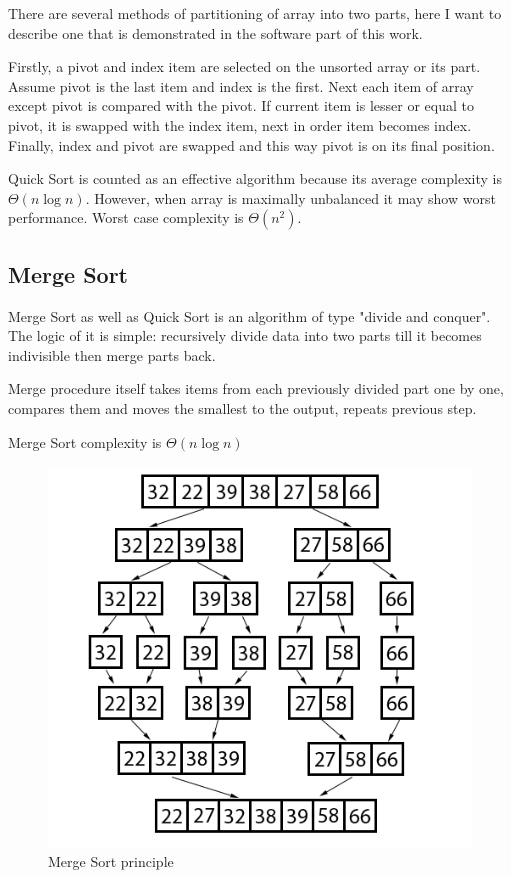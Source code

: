 \documentclass[
  field=inf,
  biblatex,
  language=english,
  glossaries,
  index
]{kidiplom}
\begin{document}
There are several methods of partitioning of array into two parts, here I want to describe one that is demonstrated in the software part of this work.

Firstly, a pivot and index item are selected on the unsorted array or its part. Assume pivot is the last item and index is the first. Next each item of array except pivot is compared with the pivot. If current item is lesser or equal to pivot, it is swapped with the index item, next in order item becomes index. Finally, index and pivot are swapped and this way pivot is on its final position.

Quick Sort is counted as an effective algorithm because its average complexity is $\Theta(n \log n)$. However, when array is maximally unbalanced it may show worst performance. Worst case complexity is $\Theta(n^2)$.

\subsection{Merge Sort}

Merge Sort as well as Quick Sort is an algorithm of type "divide and conquer". The logic of it is simple: recursively divide data into two parts till it becomes indivisible then merge parts back.

Merge procedure itself takes items from each previously divided part one by one, compares them and moves the smallest to the output, repeats previous step.

Merge Sort complexity is $\Theta(n \log n)$

\begin{figure}[H]
\begin{center}
	
	\includegraphics[scale=2.5]{img/Mergesort.png}
	\caption{Merge Sort principle}\label{fig:insert}
\end{center}
\end{figure}
\end{document}
